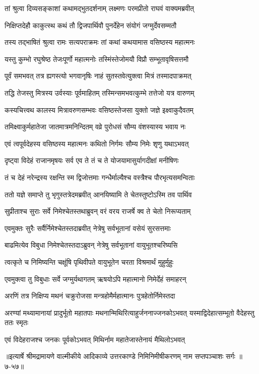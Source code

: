 
\twolineshloka
{तां श्रुत्वा दिव्यसङ्काशां कथामद्भुतदर्शनाम्}
{लक्ष्मणः परमप्रीतो राघवं वाक्यमब्रवीत्} %

\twolineshloka
{निक्षिप्तदेहौ काकुत्स्थ कथं तौ द्विजपार्थिवौ}
{पुनर्देहेन संयोगं जग्मुर्देवसम्मतौ} %

\twolineshloka
{तस्य तद्भाषितं श्रुत्वा रामः सत्यपराक्रमः}
{तां कथां कथयामास वसिष्ठस्य महात्मनः} %

\twolineshloka
{यस्तु कुम्भो रघुश्रेष्ठ तेजःपूर्णो महात्मनोः}
{तस्मिंस्तेजोमयौ विप्रौ सम्भूतावृषिसत्तमौ} %

\twolineshloka
{पूर्वं समभवत् तत्र ह्यगस्त्यो भगवानृषिः}
{नाहं सुतस्तवेत्युक्त्वा मित्रं तस्मादपाक्रमत्} %

\twolineshloka
{तद्धि तेजस्तु मित्रस्य उर्वस्याः पूर्वमाहितम्}
{तस्मिन्समभवत्कुम्भे तत्तेजो यत्र वारुणम्} %

\twolineshloka
{कस्यचित्त्वथ कालस्य मित्रावरुणसम्भवः}
{वसिष्ठस्तेजसा युक्तो जज्ञे इक्ष्वाकुदैवतम्} %

\twolineshloka
{तमिक्ष्वाकुर्महातेजा जातमात्रमनिन्दितम्}
{वव्रे पुरोधसं सौम्य वंशस्यास्य भवाय नः} %

\twolineshloka
{एवं त्वपूर्वदेहस्य वसिष्ठस्य महात्मनः}
{कथितो निर्गमः सौम्य निमेः शृणु यथाऽभवत्} %

\twolineshloka
{दृष्ट्वा विदेहं राजानमृषयः सर्व एव ते}
{तं च ते योजयामासुर्यागदीक्षां मनीषिणः} %

\twolineshloka
{तं च देहं नरेन्द्रस्य रक्षन्ति स्म द्विजोत्तमाः}
{गन्धैर्माल्यैश्च वस्त्रैश्च पौरभृत्यसमन्विताः} %

\twolineshloka
{ततो यज्ञे समाप्ते तु भृगुस्तत्रेदमब्रवीत्}
{आनयिष्यामि ते चेतस्तुष्टोऽस्मि तव पार्थिव} %

\twolineshloka
{सुप्रीताश्च सुराः सर्वे निमेश्चेतस्तथाब्रुवन्}
{वरं वरय राजर्षे क्व ते चेतो निरूप्यताम्} %

\twolineshloka
{एवमुक्तः सुरैः सर्वैर्निमेश्चेतस्तदाब्रवीत्}
{नेत्रेषु सर्वभूतानां वसेयं सुरसत्तमाः} %

\twolineshloka
{बाढमित्येव विबुधा निमेश्चेतस्तदाऽब्रुवन्}
{नेत्रेषु सर्वभूतानां वायुभूतश्चरिष्यसि} %

\twolineshloka
{त्वत्कृते च निमिष्यन्ति चक्षूंषि पृथिवीपते}
{वायुभूतेन चरता विश्रमार्थं मुहुर्मुहुः} %

\twolineshloka
{एवमुक्त्वा तु विबुधाः सर्वे जग्मुर्यथागतम्}
{ऋषयोऽपि महात्मानो निमेर्देहं समाहरन्} %

\twolineshloka
{अरणिं तत्र निक्षिप्य मथनं चक्रुरोजसा}
{मन्त्रहोमैर्महात्मानः पुत्रहेतोर्निमेस्तदा} %

\threelineshloka
{अरण्यां मथ्यामानायां प्रादुर्भूतो महातपाः}
{मथनान्मिथिरित्याहुर्जननाज्जनकोऽभवत्}
{यस्माद्विदेहात्सम्भूतो वैदेहस्तु ततः स्मृतः} %

\twolineshloka
{एवं विदेहराजश्च जनकः पूर्वकोऽभवत्}
{मिथिर्नाम महातेजास्तेनायं मैथिलोऽभवत्} %


॥इत्यार्षे श्रीमद्रामायणे वाल्मीकीये आदिकाव्ये उत्तरकाण्डे निमिनिमीषीकरणम् नाम सप्तपञ्चाशः सर्गः ॥७-५७॥
